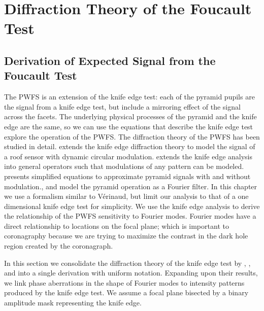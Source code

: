 \section{Diffraction Theory of the Foucault Test}\label{diffraction}
\subsection{Derivation of Expected Signal from the Foucault Test}
  The PWFS is an extension of the knife edge test: each of the pyramid pupils are the signal from a knife edge test, but include a mirroring effect of the signal across the facets. The underlying physical processes of the pyramid and the knife edge are the same, so we can use the equations that describe the knife edge test explore the operation of the PWFS. The diffraction theory of the PWFS has been studied in detail. \cite{verinaud2004nature} extends the knife edge diffraction theory to model the signal of a roof sensor with dynamic circular modulation. \cite{hutterer2019real} extends the knife edge analysis into general operators such that modulations of any pattern can be modeled. \cite{shatokhina2014fast} presents simplified equations to approximate pyramid signals with and without modulation.\cite{correia2020performance}, and \cite{fauvarque2019kernel} model the pyramid operation as a Fourier filter. In this chapter we use a formalism similar to Vérinaud, but limit our analysis to that of a one dimensional knife edge test for simplicity. We use the knife edge analysis to derive the relationship of the PWFS sensitivity to Fourier modes. Fourier modes have a direct relationship to locations on the focal plane; which is important to coronagraphy because we are trying to maximize the contrast in the dark hole region created by the coronagraph.
 
 In this section we consolidate the diffraction theory of the knife edge test by \citep{linfoot1948theory}, \citep{katzoff1971quantitative}, and \citep{wilson1975wavefront} into a single derivation with uniform notation. Expanding upon their results, we link phase aberrations in the shape of Fourier modes to intensity patterns produced by the knife edge test. We assume a focal plane bisected by a binary amplitude mask representing the knife edge. 
 
